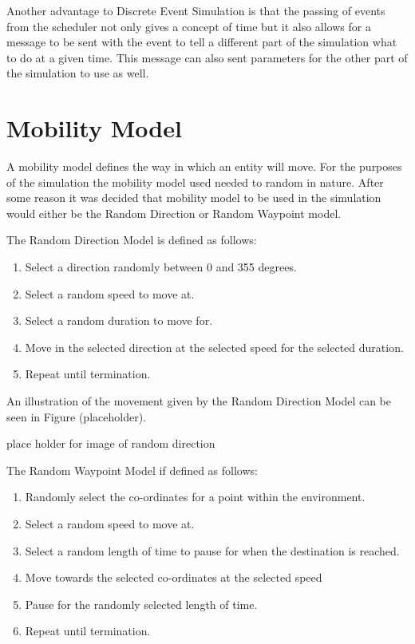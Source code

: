 Another advantage to Discrete Event Simulation is that the passing of events from the scheduler not only gives a concept of time but it also allows for a message to be sent with the event to tell a different part of the simulation what to do at a given time. This message can also sent parameters for the other part of the simulation to use as well.

\section{Mobility Model}\label{mobility}
A mobility model defines the way in which an entity will move. For the purposes of the simulation the mobility model used needed to random in nature. After some reason it was decided that mobility model to be used in the simulation would either be the Random Direction or Random Waypoint model. 

The Random Direction Model is defined as follows:
\begin{enumerate}
\item Select a direction randomly between 0 and 355 degrees.
\item Select a random speed to move at.
\item Select a random duration to move for.
\item Move in the selected direction at the selected speed for the selected duration.
\item Repeat until termination.
\end{enumerate}

An illustration of the movement given by the Random Direction Model can be seen in Figure (placeholder).

place holder for image of random direction

The Random Waypoint Model if defined as follows:
\begin{enumerate}
\item Randomly select the co-ordinates for a point within the environment.
\item Select a random speed to move at.
\item Select a random length of time to pause for when the destination is reached.
\item Move towards the selected co-ordinates at the selected speed
\item Pause for the randomly selected length of time.
\item Repeat until termination.
\end{enumerate}

